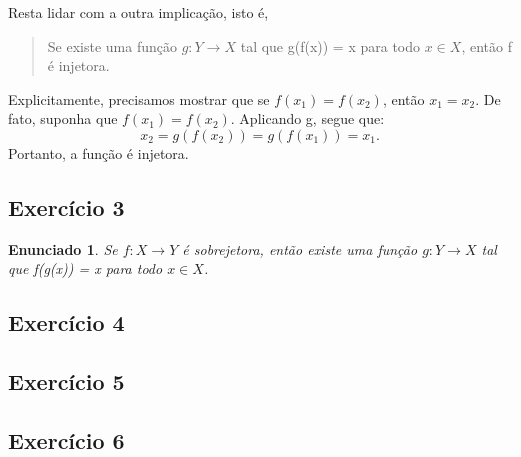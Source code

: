 \documentclass{article}
\newtheorem*{exercise*}{Enunciado}
\begin{document}
    Resta lidar com a outra implica\c c\~ao, isto \'e,
    \begin{quote}
        Se existe uma fun\c c\~ao $g:Y\rightarrow{X}$ tal que g(f(x)) = x para todo $x\in{X}$, 
        ent\~ao f \'e injetora.
    \end{quote}
    Explicitamente, precisamos mostrar que se $f(x_1) = f(x_2)$, ent\~ao $x_1 = x_2$. De fato,
    suponha que $f(x_1) = f(x_2)$. Aplicando g, segue que:
    $$
        x_2 = g(f(x_2)) = g(f(x_1)) = x_1.
    $$
    Portanto, a fun\c c\~ao \'e injetora.
    \qedsymbol
    \newpage
    
    \subsection{Exerc\'icio 3}
    \begin{exercise*}
        Se $f:X\rightarrow{Y}$ \'e sobrejetora, ent\~ao
        existe uma fun\c c\~ao $g:Y\rightarrow{X}$ tal que f(g(x)) = x para todo $x\in{X}$.            
    \end{exercise*}

    \subsection{Exerc\'icio 4}
    \subsection{Exerc\'icio 5}
    \subsection{Exerc\'icio 6}
\end{document}
